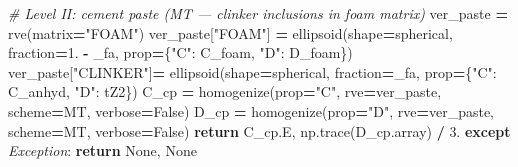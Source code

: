 \documentclass[
  a4paper,
  numbers=noendperiod,
  DIV=12]{scrreprt}
\newenvironment{Shaded}{\begin{snugshade}}{\end{snugshade}}
\newcommand{\CommentTok}[1]{\textcolor[rgb]{0.56,0.35,0.01}{\textit{#1}}}
\newcommand{\ControlFlowTok}[1]{\textcolor[rgb]{0.13,0.29,0.53}{\textbf{#1}}}
\newcommand{\FloatTok}[1]{\textcolor[rgb]{0.00,0.00,0.81}{#1}}
\newcommand{\NormalTok}[1]{#1}
\newcommand{\OperatorTok}[1]{\textcolor[rgb]{0.81,0.36,0.00}{\textbf{#1}}}
\newcommand{\PreprocessorTok}[1]{\textcolor[rgb]{0.56,0.35,0.01}{\textit{#1}}}
\newcommand{\StringTok}[1]{\textcolor[rgb]{0.31,0.60,0.02}{#1}}
\newcommand{\VariableTok}[1]{\textcolor[rgb]{0.00,0.00,0.00}{#1}}
\begin{document}
\begin{Shaded}
\begin{Highlighting}[]
        \CommentTok{\# Level II: cement paste (MT — clinker inclusions in foam matrix)}
\NormalTok{        ver\_paste }\OperatorTok{=}\NormalTok{ rve(matrix}\OperatorTok{=}\StringTok{"FOAM"}\NormalTok{)}
\NormalTok{        ver\_paste[}\StringTok{"FOAM"}\NormalTok{]   }\OperatorTok{=}\NormalTok{ ellipsoid(shape}\OperatorTok{=}\NormalTok{spherical, fraction}\OperatorTok{=}\FloatTok{1.} \OperatorTok{{-}}\NormalTok{ \_fa,}
\NormalTok{                                        prop}\OperatorTok{=}\NormalTok{\{}\StringTok{"C"}\NormalTok{: C\_foam, }\StringTok{"D"}\NormalTok{: D\_foam\})}
\NormalTok{        ver\_paste[}\StringTok{"CLINKER"}\NormalTok{]}\OperatorTok{=}\NormalTok{ ellipsoid(shape}\OperatorTok{=}\NormalTok{spherical, fraction}\OperatorTok{=}\NormalTok{\_fa,}
\NormalTok{                                        prop}\OperatorTok{=}\NormalTok{\{}\StringTok{"C"}\NormalTok{: C\_anhyd, }\StringTok{"D"}\NormalTok{: tZ2\})}
\NormalTok{        C\_cp }\OperatorTok{=}\NormalTok{ homogenize(prop}\OperatorTok{=}\StringTok{"C"}\NormalTok{, rve}\OperatorTok{=}\NormalTok{ver\_paste, scheme}\OperatorTok{=}\NormalTok{MT, verbose}\OperatorTok{=}\VariableTok{False}\NormalTok{)}
\NormalTok{        D\_cp }\OperatorTok{=}\NormalTok{ homogenize(prop}\OperatorTok{=}\StringTok{"D"}\NormalTok{, rve}\OperatorTok{=}\NormalTok{ver\_paste, scheme}\OperatorTok{=}\NormalTok{MT, verbose}\OperatorTok{=}\VariableTok{False}\NormalTok{)}
        \ControlFlowTok{return}\NormalTok{ C\_cp.E, np.trace(D\_cp.array) }\OperatorTok{/} \FloatTok{3.}
    \ControlFlowTok{except} \PreprocessorTok{Exception}\NormalTok{:}
        \ControlFlowTok{return} \VariableTok{None}\NormalTok{, }\VariableTok{None}
\end{Highlighting}
\end{Shaded}
\end{document}
